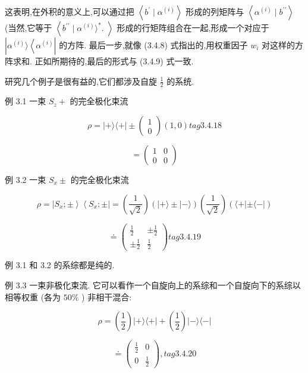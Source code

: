 这表明,在外积的意义上,可以通过把 $\left\langle {{b}^{\prime } \mid {\alpha }^{\left( i\right) }}\right\rangle$ 形成的列矩阵与 $\left\langle {{\alpha }^{\left( i\right) } \mid {b}^{\prime \prime }}\right\rangle$ (当然,它等于 $\left\langle {{b}^{\prime \prime } \mid {\alpha }^{\left( i\right) }{\rangle }^{ * }\text{. }}\right\rangle$ 形成的行矩阵组合在一起,形成一个对应于 $\left| {{\alpha }^{\left( i\right) }\rangle \left\langle {\alpha }^{\left( i\right) }\right. }\right|$ 的方阵. 最后一步,就像 (3.4.8) 式指出的,用权重因子 ${w}_{i}$ 对这样的方阵求和. 正如所期待的,最后的形式与 (3.4.9) 式一致.

研究几个例子是很有益的,它们都涉及自旋 $\frac{1}{2}$ 的系统.

例 3.1 一束 ${S}_{z} +$ 的完全极化束流

$$
\rho = \left| {+\rangle \langle + }\right| \pm \left( \begin{array}{l} 1 \\ 0 \end{array}\right) \left( {1,0}\right) tag{3. 4.18}
$$

$$
= \left( \begin{array}{ll} 1 & 0 \\ 0 & 0 \end{array}\right)
$$

例 3.2 一束 ${S}_{x} \pm$ 的完全极化束流

$$
\rho = \left| {{S}_{x}; \pm }\right\rangle \left\langle {{S}_{x}; \pm }\right| = \left( \frac{1}{\sqrt{2}}\right) \left( {\left| {+\rangle \pm }\right| - \rangle }\right) \left( \frac{1}{\sqrt{2}}\right) \left( {\langle + \left| {\pm \langle - }\right| }\right)
$$

$$
\doteq \left( \begin{matrix} \frac{1}{2} & \pm \frac{1}{2} \\ \pm \frac{1}{2} & \frac{1}{2} \end{matrix}\right) tag{3. 4.19}
$$

例 3.1 和 3.2 的系综都是纯的.

例 3.3 一束非极化束流. 它可以看作一个自旋向上的系综和一个自旋向下的系综以相等权重 (各为 ${50}\%$ ) 非相干混合:

$$
\rho = \left( \frac{1}{2}\right) \left| {+\rangle \langle + }\right| + \left( \frac{1}{2}\right) \left| {-\rangle \langle - }\right|
$$

$$
\doteq \left( \begin{array}{ll} \frac{1}{2} & 0 \\ 0 & \frac{1}{2} \end{array}\right) , tag{3. 4.20}
$$

